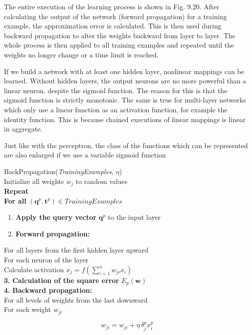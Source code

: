 \documentclass[10pt]{book}
\begin{document}
The entire execution of the learning process is shown in Fig. 9.20. After calculating the output of the network (forward propagation) for a training example, the approximation error is calculated. This is then used during backward propagation to alter the weights backward from layer to layer. The whole process is then applied to all training examples and repeated until the weights no longer change or a time limit is reached.

If we build a network with at least one hidden layer, nonlinear mappings can be learned. Without hidden layers, the output neurons are no more powerful than a linear neuron, despite the sigmoid function. The reason for this is that the sigmoid function is strictly monotonic. The same is true for multi-layer networks which only use a linear function as an activation function, for example the identity function. This is because chained executions of linear mappings is linear in aggregate.

Just like with the perceptron, the class of the functions which can be represented are also enlarged if we use a variable sigmoid function

BackPropagation(\textit{TrainingExamples}, $\eta$)\\
Initialize all weights $w_{j}$ to random values\\
\textbf{Repeat}\\
\textbf{For all} $(\boldsymbol{q}^{p}, \boldsymbol{t}^{p}) \in \textit{TrainingExamples}$

\begin{enumerate}
  \item \textbf{Apply the query vector} $\boldsymbol{q}^{p}$ to the input layer
  \item \textbf{Forward propagation:}
\end{enumerate}

For all layers from the first hidden layer upward\\
For each neuron of the layer\\
Calculate activation $x_{j}=f\left(\sum_{i=1}^{n} w_{ji} x_{i}\right)$\\
\textbf{3.} \textbf{Calculation of the square error} $E_{p}(\boldsymbol{w})$\\
\textbf{4.} \textbf{Backward propagation:}\\
For all levels of weights from the last downward\\
For each weight $w_{ji}$

\[
w_{ji}=w_{ji}+\eta\,\delta_{j}^{p} x_{i}^{p}
\]
\end{document}
